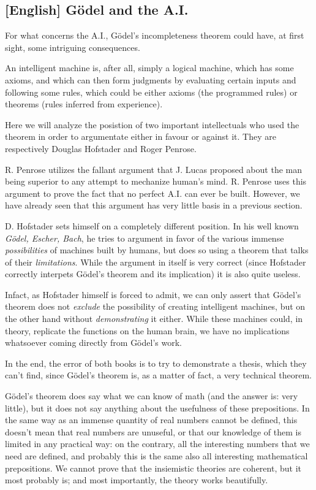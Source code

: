 \documentclass[a4paper,10pt]{article}
\begin{document}
\subsection{[English] Gödel and the A.I.}

For what concerns the A.I., Gödel's incompleteness theorem could have, at first sight, some intriguing consequences.

An intelligent machine is, after all, simply a logical machine, which has some axioms, and which can then form judgments by evaluating certain inputs and following some rules, which could be either axioms (the programmed rules) or theorems (rules inferred from experience).

Here we will analyze the posistion of two important intellectuals who used the theorem in order to argumentate either in favour or against it. They are respectively Douglas Hofstader and Roger Penrose.

R. Penrose utilizes the fallant argument that J. Lucas proposed about the man being superior to any attempt to mechanize human's mind. R. Penrose uses this argument \cite{penrose91} to prove the fact that no perfect A.I. can ever be built. However, we have already seen that this argument has very little basis in a previous section.

D. Hofstader sets himself on a completely different position. In his well known \textit{Gödel, Escher, Bach}\cite{geb}, he tries to argument in favor of the various immense \textit{possibilities} of machines built by humans, but does so using a theorem that talks of their \textit{limitations}.
While the argument in itself is very correct (since Hofstader correctly interpets Gödel's theorem and its implication) it is also quite useless.

Infact, as Hofstader himself is forced to admit, we can only assert that Gödel's theorem does not \textit{exclude} the possibility of creating intelligent machines, but on the other hand without \textit{demonstrating} it either. While these machines could, in theory, replicate the functions on the human brain, we have no implications whatsoever coming directly from Gödel's work.

In the end, the error of both books is to try to demonstrate a thesis, which they can't find, since Gödel's theorem is, as a matter of fact, a very technical theorem.

Gödel's theorem does say what we can know of math (and the answer is: very little), but it does not say anything about the usefulness of these prepositions. In the same way as an immense quantity of real numbers cannot be defined, this doesn't mean that real numbers are unuseful, or that our knowledge of them is limited in any practical way: on the contrary, all the interesting numbers that we need are defined, and probably this is the same also all interesting mathematical prepositions. We cannot prove that the insiemistic theories are coherent, but it most probably is; and most importantly, the theory works beautifully.
\end{document}
